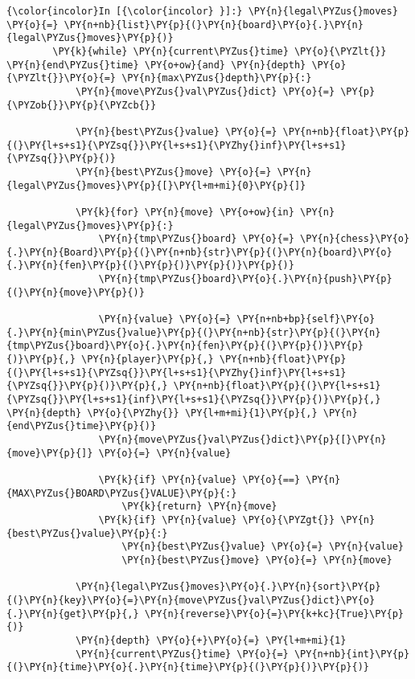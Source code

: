     \begin{Verbatim}[commandchars=\\\{\}]
{\color{incolor}In [{\color{incolor} }]:} \PY{n}{legal\PYZus{}moves} \PY{o}{=} \PY{n+nb}{list}\PY{p}{(}\PY{n}{board}\PY{o}{.}\PY{n}{legal\PYZus{}moves}\PY{p}{)}
        \PY{k}{while} \PY{n}{current\PYZus{}time} \PY{o}{\PYZlt{}} \PY{n}{end\PYZus{}time} \PY{o+ow}{and} \PY{n}{depth} \PY{o}{\PYZlt{}}\PY{o}{=} \PY{n}{max\PYZus{}depth}\PY{p}{:}
            \PY{n}{move\PYZus{}val\PYZus{}dict} \PY{o}{=} \PY{p}{\PYZob{}}\PY{p}{\PYZcb{}}
        
            \PY{n}{best\PYZus{}value} \PY{o}{=} \PY{n+nb}{float}\PY{p}{(}\PY{l+s+s1}{\PYZsq{}}\PY{l+s+s1}{\PYZhy{}inf}\PY{l+s+s1}{\PYZsq{}}\PY{p}{)}
            \PY{n}{best\PYZus{}move} \PY{o}{=} \PY{n}{legal\PYZus{}moves}\PY{p}{[}\PY{l+m+mi}{0}\PY{p}{]}
        
            \PY{k}{for} \PY{n}{move} \PY{o+ow}{in} \PY{n}{legal\PYZus{}moves}\PY{p}{:}
                \PY{n}{tmp\PYZus{}board} \PY{o}{=} \PY{n}{chess}\PY{o}{.}\PY{n}{Board}\PY{p}{(}\PY{n+nb}{str}\PY{p}{(}\PY{n}{board}\PY{o}{.}\PY{n}{fen}\PY{p}{(}\PY{p}{)}\PY{p}{)}\PY{p}{)}
                \PY{n}{tmp\PYZus{}board}\PY{o}{.}\PY{n}{push}\PY{p}{(}\PY{n}{move}\PY{p}{)}
        
                \PY{n}{value} \PY{o}{=} \PY{n+nb+bp}{self}\PY{o}{.}\PY{n}{min\PYZus{}value}\PY{p}{(}\PY{n+nb}{str}\PY{p}{(}\PY{n}{tmp\PYZus{}board}\PY{o}{.}\PY{n}{fen}\PY{p}{(}\PY{p}{)}\PY{p}{)}\PY{p}{,} \PY{n}{player}\PY{p}{,} \PY{n+nb}{float}\PY{p}{(}\PY{l+s+s1}{\PYZsq{}}\PY{l+s+s1}{\PYZhy{}inf}\PY{l+s+s1}{\PYZsq{}}\PY{p}{)}\PY{p}{,} \PY{n+nb}{float}\PY{p}{(}\PY{l+s+s1}{\PYZsq{}}\PY{l+s+s1}{inf}\PY{l+s+s1}{\PYZsq{}}\PY{p}{)}\PY{p}{,} \PY{n}{depth} \PY{o}{\PYZhy{}} \PY{l+m+mi}{1}\PY{p}{,} \PY{n}{end\PYZus{}time}\PY{p}{)}
                \PY{n}{move\PYZus{}val\PYZus{}dict}\PY{p}{[}\PY{n}{move}\PY{p}{]} \PY{o}{=} \PY{n}{value}
        
                \PY{k}{if} \PY{n}{value} \PY{o}{==} \PY{n}{MAX\PYZus{}BOARD\PYZus{}VALUE}\PY{p}{:}
                    \PY{k}{return} \PY{n}{move}
                \PY{k}{if} \PY{n}{value} \PY{o}{\PYZgt{}} \PY{n}{best\PYZus{}value}\PY{p}{:}
                    \PY{n}{best\PYZus{}value} \PY{o}{=} \PY{n}{value}
                    \PY{n}{best\PYZus{}move} \PY{o}{=} \PY{n}{move}
        
            \PY{n}{legal\PYZus{}moves}\PY{o}{.}\PY{n}{sort}\PY{p}{(}\PY{n}{key}\PY{o}{=}\PY{n}{move\PYZus{}val\PYZus{}dict}\PY{o}{.}\PY{n}{get}\PY{p}{,} \PY{n}{reverse}\PY{o}{=}\PY{k+kc}{True}\PY{p}{)}
            \PY{n}{depth} \PY{o}{+}\PY{o}{=} \PY{l+m+mi}{1}
            \PY{n}{current\PYZus{}time} \PY{o}{=} \PY{n+nb}{int}\PY{p}{(}\PY{n}{time}\PY{o}{.}\PY{n}{time}\PY{p}{(}\PY{p}{)}\PY{p}{)}
\end{Verbatim}

